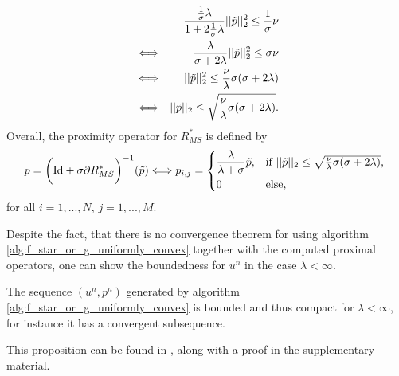             \begin{eqnarray}
                &&\frac{\frac{1}{\sigma}\lambda}{1 + 2\frac{1}{\sigma}\lambda} ||\tilde{p}||_{2}^{2} \le \frac{1}{\sigma} \nu \notag \\
                &\Longleftrightarrow& \frac{\lambda}{\sigma + 2\lambda} ||\tilde{p}||_{2}^{2} \le \sigma \nu \notag \\
                &\Longleftrightarrow& ||\tilde{p}||_{2}^{2} \le \frac{\nu}{\lambda}\sigma(\sigma + 2\lambda) \notag \\
                &\Longleftrightarrow& ||\tilde{p}||_{2} \le \sqrt{\frac{\nu}{\lambda}\sigma(\sigma + 2\lambda)}. \label{eq:constraint_R_star}
            \end{eqnarray}
        Overall, the proximity operator for $R_{MS}^{\ast}$ is defined by
            \begin{equation}
                p = \bigg( \textnormal{Id} + \sigma \partial R_{MS}^{\ast} \bigg)^{-1}(\tilde{p}) \Longleftrightarrow p_{i,j} =
                    \begin{dcases*}
                        \frac{\lambda}{\lambda + \sigma} \tilde{p}, & \textnormal{if $||\tilde{p}||_{2} \le \sqrt{\frac{\nu}{\lambda}\sigma(\sigma + 2\lambda)}$,} \\
                        0 & \textnormal{else,}
                    \end{dcases*}
                \label{eq:proximity_operator_r_star}
            \end{equation}
        for all $i = 1, ..., N$, $j = 1, ..., M$.

        Despite the fact, that there is no convergence theorem for using algorithm \ref{alg:f_star_or_g_uniformly_convex} together with the computed proximal operators, one can show the boundedness for $u^{n}$ in the case $\lambda < \infty$.

        \begin{proposition}
        \label{prop:boundedness_realtime_algorithm}
            The sequence $(u^{n}, p^{n})$ generated by algorithm \ref{alg:f_star_or_g_uniformly_convex} is bounded and thus compact for $\lambda < \infty$, for instance it has a convergent subsequence.
        \end{proposition}

        This proposition can be found in \cite{Strekalovskiy-Cremers-eccv14}, along with a proof in the supplementary material.


